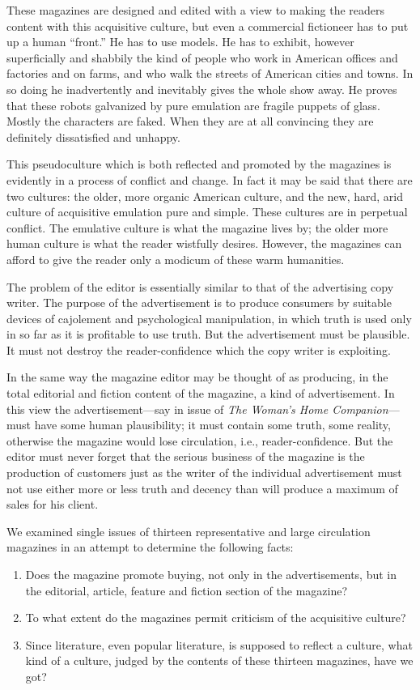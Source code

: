 \documentclass[openany,nobib]{tufte-book}
\begin{document}
These magazines are designed and edited with a view to making the
readers content with this acquisitive culture, but even a commercial
fictioneer has to put up a human ``front.'' He has to use models. He has
to exhibit, however superficially and shabbily the kind of people who
work in American offices and factories and on farms, and who walk the
streets of American cities and towns. In so doing he inadvertently and
inevitably gives the whole show away. He proves that these robots
galvanized by pure emulation are fragile puppets of glass. Mostly the
characters are faked. When they are at all convincing they are
definitely dissatisfied and unhappy.

This pseudoculture which is both reflected and promoted by the magazines
is evidently in a process of conflict and change. In fact it may be said
that there are two cultures: the older, more organic American culture,
and the new, hard, arid culture of acquisitive emulation pure and
simple. These cultures are in perpetual conflict. The emulative culture
is what the magazine lives by; the older more human culture is what the
reader wistfully desires. However, the magazines can afford to give the
reader only a modicum of these warm humanities.

The problem of the editor is essentially similar to that of the
advertising copy writer. The purpose of the advertisement is to produce
consumers by suitable devices of cajolement and psychological
manipulation, in which truth is used only in so far as it is profitable
to use truth. But the advertisement must be plausible. It must not
destroy the reader-confidence which the copy writer is exploiting.

In the same way the magazine editor may be thought of as producing, in
the total editorial and fiction content of the magazine, a kind of
advertisement. In this view the advertisement---say in issue of
\emph{The Woman's Home Companion}---must have some human plausibility;
it must contain some truth, some reality, otherwise the magazine would
lose circulation, i.e., reader-confidence. But the editor must never
forget that the serious business of the magazine is the production of
customers just as the writer of the individual advertisement must not
use either more or less truth and decency than will produce a maximum of
sales for his client.

We examined single issues of thirteen representative and large
circulation magazines in an attempt to determine the following facts:

\begin{enumerate}
\item
  Does the magazine promote buying, not only in the advertisements, but
  in the editorial, article, feature and fiction section of the
  magazine?
\item
  To what extent do the magazines permit criticism of the acquisitive
  culture?
\item
  Since literature, even popular literature, is supposed to reflect a
  culture, what kind of a culture, judged by the contents of these
  thirteen magazines, have we got?
\end{enumerate}
\end{document}
